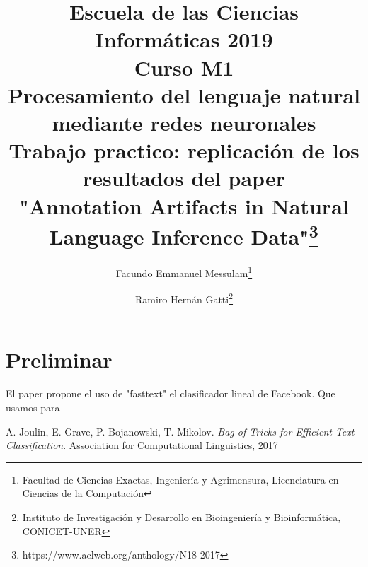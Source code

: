 \documentclass{article}
\title{Escuela de las Ciencias Informáticas 2019\\
	{\small{Curso M1}}\\
	Procesamiento del lenguaje natural mediante redes neuronales\\
	{\small{Trabajo practico: replicación de los resultados del paper}}\\
	"Annotation Artifacts in Natural Language Inference Data"\footnote{https://www.aclweb.org/anthology/N18-2017}}
\author{Facundo Emmanuel Messulam\footnote{Facultad de Ciencias Exactas, Ingeniería y Agrimensura, Licenciatura en Ciencias de la Computación}
	\and
	Ramiro Hernán Gatti\footnote{Instituto de Investigación y Desarrollo en Bioingeniería y Bioinformática, CONICET-UNER}}
\begin{document}
    \begin{titlepage}
        \maketitle
        \thispagestyle{empty}
    \end{titlepage}
	
	\section*{Preliminar}
	El paper propone el uso de "fasttext" el clasificador lineal de Facebook\cite{joulin2017bag}. Que usamos para
	
	\newpage
	\begin{thebibliography}{9}
		A. Joulin, E. Grave, P. Bojanowski, T. Mikolov. \textit{Bag of Tricks for Efficient Text Classification}. Association for Computational Linguistics, 2017
	\end{thebibliography}
\end{document}
